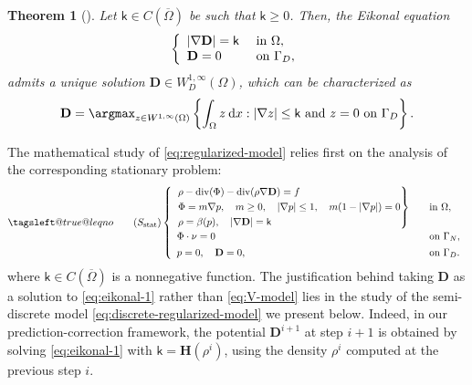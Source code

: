 \documentclass[final,reqno]{amsart}
\makeatletter
\theoremstyle{plain}
\newtheorem{theorem}{Theorem}	%
\theoremstyle{definition}
\theoremstyle{remark}
\numberwithin{remark}{section}	%
\numberwithin{example}{section}	%
\DeclareMathOperator{\dive}{div}
\newcommand{\de}{\mathbf{D}}
\newcommand{\he}{\mathbf{H}}
\newcommand{\Om}{\Omega}
\newcommand{\kk}{\mathsf{k}}
\newcommand{\dd}{\mathrm{d}}
\newcommand{\leqnomode}{\tagsleft@true\let\veqno\@@leqno}
\makeatother
\begin{document}
\begin{theorem}[\cite{EnnajiaugmentedLag}]\label{EnnajiaugmentedLag}
    Let $\kk \in C(\overline{\Omega})$ be such that $\kk \ge 0$. Then, the Eikonal equation
    \begin{equation}\label{eq:eikonal-1}
    \left\lbrace\begin{array}{ll}
        \vert \nabla \de \vert = \kk & \hbox{ in }\Om,\\ 
        \de = 0 & \hbox{ on } \Gamma_D,
    \end{array}
    \right.
    \end{equation}
    admits a unique solution $\de \in W_D^{1,\infty}(\Om)$, which can be characterized as 
    \begin{equation}
        \de = \argmax_{z \in W^{1,\infty}(\Om)}\left\{ \int_\Omega z \: \dd x : \vert \nabla z\vert \leq \kk \mbox{ and } z=0 \mbox{ on } \Gamma_D \right\}.
    \end{equation}
\end{theorem}	
The mathematical study of \eqref{eq:regularized-model} relies first on the analysis of the corresponding stationary problem:
\begin{equation}\leqnomode
    \tag{$S_{\textup{stat}}$}
    \label{eq:stat-regularized-model}
    \left\{
    \begin{array}{ll}
    \left. \begin{aligned}
        &\rho -\dive (\Phi) -\dive(\rho \nabla \de) = f  \\
        &\Phi = m \nabla p, \quad m\geq0, \quad \vert \nabla p\vert \leq 1, \quad m(1-\vert \nabla p\vert)=0 \\
        &\rho = \beta(p), \quad \vert \nabla \de \vert=\kk 
        \end{aligned} \right\} \quad & \text{in } \Omega, \\[4ex]
        \Phi \cdot \nu = 0 & \text{on } \Gamma_N, \\[1ex]
        p = 0, \quad \de = 0, & \text{on } \Gamma_D.
    \end{array}
    \right.
\end{equation}
where $\kk\in C(\overline{\Omega})$ is a nonnegative function. The justification behind taking $\de$ as a solution to \eqref{eq:eikonal-1} rather than \eqref{eq:V-model} lies in the study of the semi-discrete model \eqref{eq:discrete-regularized-model} we present below. Indeed, in our prediction-correction framework, the potential $\de^{i+1}$ at step $i+1$ is obtained by solving \eqref{eq:eikonal-1} with $\kk = \he(\rho^{i})$, using the density $\rho^{i}$ computed at the previous step $i$.
\end{document}

